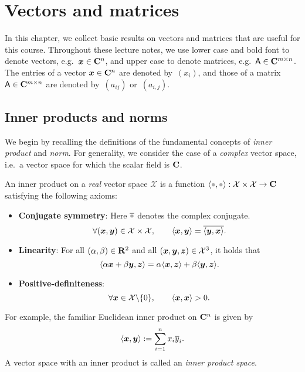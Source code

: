 \setlength{\OuterFrameSep}{0pt}

\chapter{Vectors and matrices}%
\label{cha:vectors_and_matrices}

In this chapter,
we collect basic results on vectors and matrices that are useful for this course.
Throughout these lecture notes,
we use lower case and bold font to denote vectors, e.g.\ $\mathbf{\boldsymbol{x}} \in \mathbf C^n$,
and upper case to denote matrices, e.g.\ $\mathsf A \in \mathbf C^{m \times n}$.
The entries of a vector $\mathbf{\boldsymbol{x}} \in \mathbf C^n$ are denoted by~$(x_i)$,
and those of a matrix $\mathsf A \in \mathbf C^{m \times n}$ are denoted by~$(a_{ij})$ or~$(a_{i,j})$.

\section{Inner products and norms}%
\label{sec:inner_product_and_norm}

We begin by recalling the definitions of the fundamental concepts of \emph{inner product} and \emph{norm}.
For generality,
we consider the case of a \emph{complex} vector space,
i.e.\ a vector space for which the scalar field is $\mathbf C$.
\begin{definition}
    An inner product on a \emph{real} vector space $\mathcal X$ is a function $\ip{\placeholder,\placeholder}: \mathcal X \times \mathcal X \to \complex$ satisfying the following axioms:
    \begin{itemize}
        \item
            \textbf{Conjugate symmetry}:
            Here $\overline \placeholder$ denotes the complex conjugate.
            \[
                \forall (\mathbf{\boldsymbol{x}}, \mathbf{\boldsymbol{y}}) \in \mathcal X \times \mathcal X, \qquad
                \langle\mathbf{\boldsymbol{x}}, \mathbf{\boldsymbol{y}}\rangle = \overline{\langle\mathbf{\boldsymbol{y}}, \mathbf{\boldsymbol{x}}\rangle}.
            \]
        \item
            \textbf{Linearity}:
            For all $(\alpha, \beta) \in \mathbf R^2$ and all $(\mathbf{\boldsymbol{x}}, \mathbf{\boldsymbol{y}}, \mathbf{\boldsymbol{z}}) \in \mathcal X^3$,
            it holds that
            \[
                \langle\alpha \mathbf{\boldsymbol{x}} + \beta \mathbf{\boldsymbol{y}}, \mathbf{\boldsymbol{z}}\rangle
                = \alpha \langle\mathbf{\boldsymbol{x}}, \mathbf{\boldsymbol{z}}\rangle + \beta \langle\mathbf{\boldsymbol{y}}, \mathbf{\boldsymbol{z}}\rangle.
            \]

        \item
            \textbf{Positive-definiteness}:
            \[
                \forall \mathbf{\boldsymbol{x}} \in \mathcal X \backslash \{0\}, \qquad
                \langle\mathbf{\boldsymbol{x}}, \mathbf{\boldsymbol{x}}\rangle > 0.
            \]
    \end{itemize}
\end{definition}
For example, the familiar Euclidean inner product on $\mathbf C^n$ is given by
\[
    \langle\mathbf{\boldsymbol{x}}, \mathbf{\boldsymbol{y}}\rangle := \sum_{i=1}^{n} x_i \overline y_i.
\]
A vector space with an inner product is called an \emph{inner product space}.

